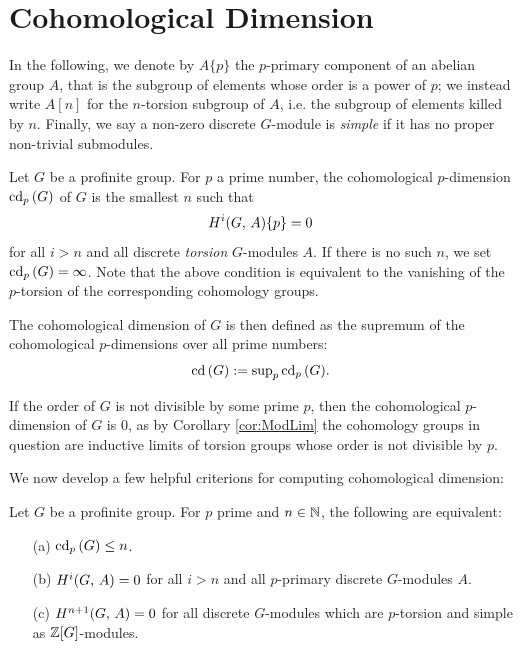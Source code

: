 \documentclass[a4paper, oneside]{memoir}
\begin{document}
\section{Cohomological Dimension}

In the following, we denote by $A\{p\}$ the $p$-primary component of an abelian group $A$, that is the subgroup of elements whose order is a power of $p$; we instead write $A[n]$ for the $n$-torsion subgroup of $A$, i.e. the subgroup of elements killed by $n$. Finally, we say a non-zero discrete $G$-module is \textit{simple} if it has no proper non-trivial submodules.

\begin{definition}
	Let $G$ be a profinite group. For $p$ a prime number, the cohomological $p$-dimension $\operatorname{cd}_p{(G)}$ of $G$ is the smallest $n$ such that
	\[
		H^{i}( G, \, A )\{p\}=0
	\] for all $i>n$ and all discrete \textit{torsion} $G$-modules $A$. If there is no such $n$, we set $\operatorname{cd}_p{(G)}=\infty$. Note that the above condition is equivalent to the vanishing of the $p$-torsion of the corresponding cohomology groups.

	The cohomological dimension of $G$ is then defined as the supremum of the cohomological $p$-dimensions over all prime numbers:
	\[
		\operatorname{cd}{(G)}:=\sup_{p}\nolimits\operatorname{cd}_p{(G)}.
	\]
\end{definition}

\begin{remark}
	If the order of $G$ is not divisible by some prime $p$, then the cohomological $p$-dimension of $G$ is $0$, as by Corollary \ref{cor:ModLim} the cohomology groups in question are inductive limits of torsion groups whose order is not divisible by $p$.
\end{remark}

We now develop a few helpful criterions for computing cohomological dimension:

\begin{theorem}\label{thm:CdSimple}
	Let $G$ be a profinite group. For $p$ prime and $n\in\mathbb{N}$, the following are equivalent:
	\begin{itemize}
		\item[(a)] $\operatorname{cd}_p{(G)}\leq n$.
		\item[(b)] $H^{i}( G, \, A )=0$ for all $i>n$ and all $p$-primary discrete $G$-modules $A$.
		\item[(c)] $H^{n+1}( G, \, A )=0$ for all discrete $G$-modules which are $p$-torsion and simple as $\mathbb{Z}[G]$-modules.
	\end{itemize}
\end{theorem}
\end{document}
